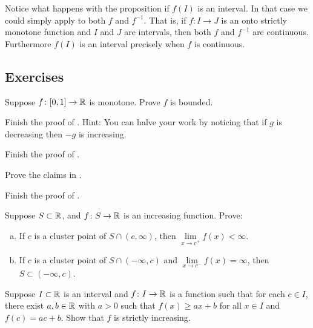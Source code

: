 Notice what happens with the proposition if $f(I)$ is an interval.  In that case we could simply
apply  to both $f$ and $f^{-1}$.  That is, if
$f \colon I \to J$ is an onto strictly monotone function and $I$ and $J$ are intervals,
then both $f$ and $f^{-1}$ are continuous.  Furthermore $f(I)$ is an
interval precisely when $f$ is continuous.

\subsection{Exercises}

\begin{exercise}
Suppose $f \colon [0,1] \to {\mathbb{R}}$ is monotone.  Prove $f$ is bounded.
\end{exercise}

\begin{exercise}
Finish the proof of .
Hint: You can halve your work by noticing that if $g$ is decreasing
then $-g$ is increasing.
\end{exercise}

\begin{exercise}
Finish the proof of .
\end{exercise}

\begin{exercise}
Prove the claims in .
\end{exercise}

\begin{exercise}
Finish the proof of .
\end{exercise}

\begin{samepage}
\begin{exercise}
Suppose $S \subset {\mathbb{R}}$, and $f \colon S \to {\mathbb{R}}$ is an increasing
function.  Prove:
\begin{enumerate}[a)]
\item
If $c$ is a cluster point
of $S \cap (c,\infty)$, then
$\lim\limits_{x\to c^+} f(x) < \infty$.
\item
If $c$ is a cluster point of $S \cap (-\infty,c)$
and $\lim\limits_{x\to c^-} f(x) = \infty$, then
$S \subset (-\infty,c)$.
\end{enumerate}
\end{exercise}
\end{samepage}

\begin{exercise}
Suppose $I \subset {\mathbb{R}}$ is an interval and $f \colon I \to {\mathbb{R}}$ is a function
such that for each $c \in I$, there exist $a, b \in {\mathbb{R}}$ with
$a > 0$ such that $f(x) \geq a x + b$ for all $x \in I$
and $f(c) = a c + b$.  Show that $f$ is strictly increasing.
\end{exercise}

